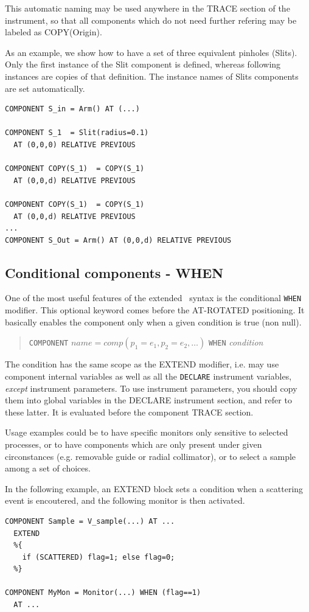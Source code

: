 This automatic naming may be used anywhere in the TRACE section of the instrument, so that all components which do not need further refering may be labeled as COPY(Origin).

As an example, we show how to have a set of three equivalent pinholes (Slits). Only the first instance of the Slit component is defined, whereas following instances are copies of that definition.
The instance names of Slits components are set automatically.

\begin{verbatim}
COMPONENT S_in = Arm() AT (...)

COMPONENT S_1  = Slit(radius=0.1)
  AT (0,0,0) RELATIVE PREVIOUS

COMPONENT COPY(S_1)  = COPY(S_1)
  AT (0,0,d) RELATIVE PREVIOUS

COMPONENT COPY(S_1)  = COPY(S_1)
  AT (0,0,d) RELATIVE PREVIOUS
...
COMPONENT S_Out = Arm() AT (0,0,d) RELATIVE PREVIOUS
\end{verbatim}

\subsection{Conditional components - WHEN}
\label{s:instrdefs-extend-when}

One of the most useful features of the extended \MCX\ syntax is the conditional \texttt{WHEN} modifier. This optional keyword comes before the AT-ROTATED positioning. It basically enables the component only when a given condition is true (non null).

\begin{quote}
  \texttt{COMPONENT} $\textit{name} = \textit{comp}(p_1 = e_1, p_2 = e_2, \ldots)$
  \texttt{WHEN} \textit{condition}
\end{quote}
The condition has the same scope as the EXTEND modifier, i.e. may use component internal variables as well as all the \texttt{DECLARE} instrument variables, \emph{except} instrument parameters. To use instrument parameters, you should copy them into global variables in the DECLARE instrument section, and refer to these latter.
It is evaluated before the component TRACE section.

Usage examples could be to have specific monitors only sensitive to selected processes, or to have components which are only present under given circonstances (e.g. removable guide or radial collimator), or to select a sample among a set of choices.

In the following example, an EXTEND block sets a condition when a scattering event is encoutered, and the following monitor is then activated.
\begin{verbatim}
COMPONENT Sample = V_sample(...) AT ...
  EXTEND
  %{
    if (SCATTERED) flag=1; else flag=0;
  %}

COMPONENT MyMon = Monitor(...) WHEN (flag==1)
  AT ...
\end{verbatim}

